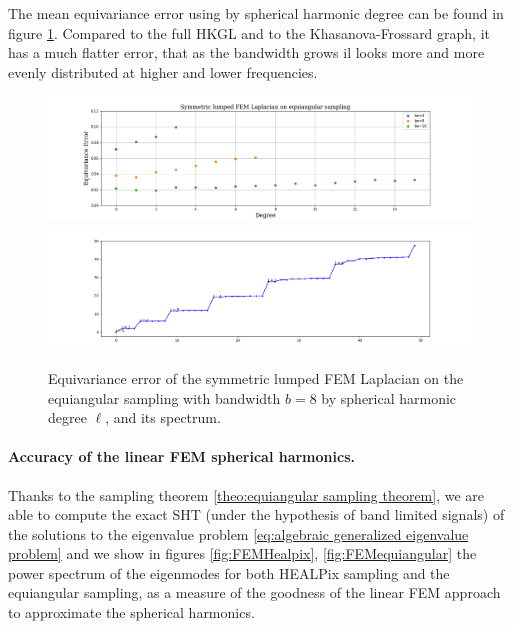 The mean equivariance error using by spherical harmonic degree can be found in figure \ref{fig:Equivariance error of the symmetric lumped FEM Laplacian}. Compared to the full HKGL and to the Khasanova-Frossard graph, it has a much flatter error, that as the bandwidth grows il looks more and more evenly distributed at higher and lower frequencies. 
\begin{figure}[h]
	\centering
	\includegraphics[width=\textwidth]{../codes/06.Equivariance_error/SymmetriclumpedFEMLaplacianonequiangularsampling.png}
	\includegraphics[width=\textwidth]{../codes/03.FEM_laplacian/equiangular/mass_lumping/BLB/img/FEM_eigenvalues_bw16.png}
	\caption{\label{fig:Equivariance error of the symmetric lumped FEM Laplacian}Equivariance error of the symmetric lumped FEM Laplacian on the equiangular sampling with bandwidth $b=8$ by spherical harmonic degree $\ell$, and its spectrum.}
\end{figure}

\paragraph{Accuracy of the linear FEM spherical harmonics.} Thanks to the sampling theorem \ref{theo:equiangular sampling theorem}, we are able to compute the exact SHT (under the hypothesis of band limited signals) of the solutions to the eigenvalue problem \ref{eq:algebraic generalized eigenvalue problem} and we show in figures \ref{fig:FEMHealpix}, \ref{fig:FEMequiangular} the power spectrum of the eigenmodes for both HEALPix sampling and the equiangular sampling, as a measure of the goodness of the linear FEM approach to approximate the spherical harmonics.

